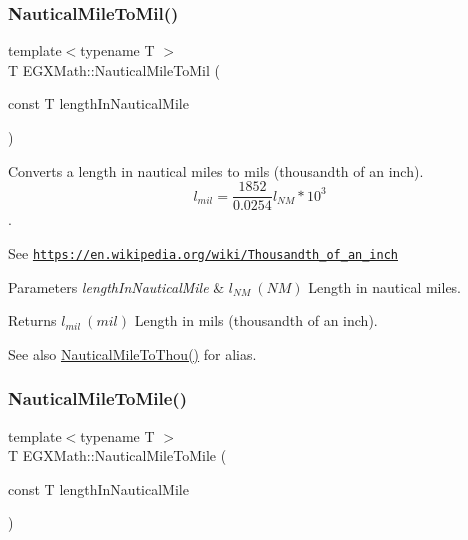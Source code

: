 \subsubsection{\texorpdfstring{Nautical\+Mile\+To\+Mil()}{NauticalMileToMil()}}
{\footnotesize\ttfamily template$<$typename T $>$ \\
T E\+G\+X\+Math\+::\+Nautical\+Mile\+To\+Mil (\begin{DoxyParamCaption}\item[{const T}]{length\+In\+Nautical\+Mile }\end{DoxyParamCaption})}



Converts a length in nautical miles to mils (thousandth of an inch). \[ l_{mil}= \frac{1852}{0.0254} l_{NM} * 10^{3} \]. 

See \href{https://en.wikipedia.org/wiki/Thousandth_of_an_inch}{\tt https\+://en.\+wikipedia.\+org/wiki/\+Thousandth\+\_\+of\+\_\+an\+\_\+inch} 
\begin{DoxyParams}{Parameters}
{\em length\+In\+Nautical\+Mile} & $ l_{NM}\ (NM)$ Length in nautical miles. \\
\hline
\end{DoxyParams}
\begin{DoxyReturn}{Returns}
$ l_{mil}\ (mil)$ Length in mils (thousandth of an inch). 
\end{DoxyReturn}
\begin{DoxySeeAlso}{See also}
\mbox{\hyperlink{group___e_g_x_math-_conversions-_length_conversions-_nautical-_nautical_mile-_imperial_ga2791d7d115ca8640a88ce3180db9dddb}{Nautical\+Mile\+To\+Thou()}} for alias. 
\end{DoxySeeAlso}
\mbox{\label{group___e_g_x_math-_conversions-_length_conversions-_nautical-_nautical_mile-_imperial_ga9be4e73b064274bd79a406d7ed69d21f}} 
\subsubsection{\texorpdfstring{Nautical\+Mile\+To\+Mile()}{NauticalMileToMile()}}
{\footnotesize\ttfamily template$<$typename T $>$ \\
T E\+G\+X\+Math\+::\+Nautical\+Mile\+To\+Mile (\begin{DoxyParamCaption}\item[{const T}]{length\+In\+Nautical\+Mile }\end{DoxyParamCaption})}



